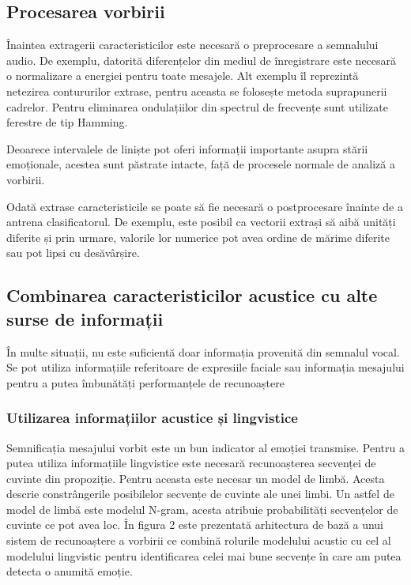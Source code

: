 \documentclass[9pt,shortpaper,twoside,web]{ieeecolor}
\begin{document}
\subsection{Procesarea vorbirii}
Înaintea extragerii caracteristicilor este necesară o preprocesare a semnalului audio. De exemplu, datorită diferențelor din mediul de înregistrare este necesară o normalizare a energiei pentru toate mesajele. Alt exemplu îl reprezintă netezirea contururilor extrase, pentru aceasta se folosește metoda suprapunerii cadrelor. Pentru eliminarea ondulațiilor din spectrul de frecvențe sunt utilizate ferestre de tip Hamming.

Deoarece intervalele de liniște pot oferi informații importante asupra stării emoționale, acestea sunt păstrate intacte, față de procesele normale de analiză a vorbirii.

Odată extrase caracteristicile se poate să fie necesară o postprocesare înainte de a antrena clasificatorul. De exemplu, este posibil ca vectorii extrași să aibă unități diferite și prin urmare, valorile lor numerice pot avea ordine de mărime diferite sau pot lipsi cu desăvârșire.

\subsection{Combinarea caracteristicilor acustice cu alte surse de informații}
În multe situații, nu este suficientă doar informația provenită din semnalul vocal. Se pot utiliza informațiile referitoare de expresiile faciale sau informația mesajului pentru a putea îmbunătăți performanțele de recunoaștere


\subsubsection{Utilizarea informațiilor acustice și lingvistice}
Semnificația mesajului vorbit este un bun indicator al emoției transmise. Pentru a putea utiliza informațiile lingvistice este necesară recunoașterea secvenței de cuvinte din propoziție. Pentru aceasta este necesar un model de limbă. Acesta descrie constrângerile posibilelor secvențe de cuvinte ale unei limbi. Un astfel de model de limbă este modelul N-gram, acesta atribuie probabilități secvențelor de cuvinte ce pot avea loc. În figura 2 este prezentată arhitectura de bază a unui sistem de recunoaștere a vorbirii ce combină rolurile modelului acustic cu cel al modelului lingvistic pentru identificarea celei mai bune secvențe în care am putea detecta o anumită emoție.
\end{document}

